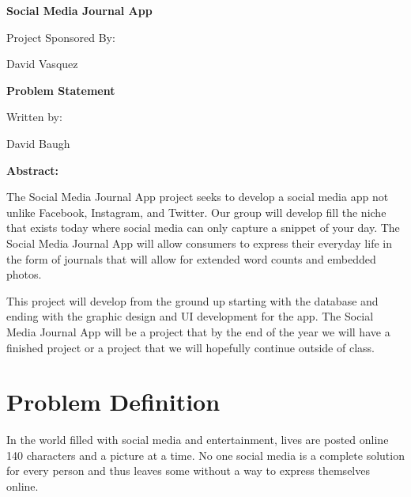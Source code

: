 \documentclass[letterpaper,10pt,titlepage]{article}
\begin{document}
\begin{titlepage}
\begin{center}
\vspace*{3cm}
\huge{\textbf{Social Media Journal App}}\par
\vspace{1cm}
\large{Project Sponsored By:}\par
\vspace{3mm}
\normalsize{David Vasquez}\par
\vspace{1cm}
\huge{\textbf{Problem Statement}}\par
\vspace{1cm}
\large{Written by:}\par
\vspace{3mm}
\normalsize{David Baugh}\par
\vspace{25mm}
\large{\textbf{Abstract:}}\par 
\vspace{4mm}
\normalsize{The Social Media Journal App project seeks to develop a social media 
app not unlike Facebook, Instagram, and Twitter. Our group will develop fill the 
niche that exists today where social media can only capture a snippet of your day. 
The Social Media Journal App will allow consumers to express their everyday life 
in the form of journals that will allow for extended word counts and embedded photos.

This project will develop from the ground up starting with the database and ending
 with the graphic design and UI development for the app. The Social Media Journal App
  will be a project that by the end of the year we will have a finished project or a 
  project that we will hopefully continue outside of class.}
\end{center}
\end{titlepage}

\setlength\parindent{4mm}
\section*{Problem Definition}\par
\hspace{4ex}In the world filled with social media and entertainment, lives are 
posted online 140 characters and a picture at a time. No one social media is 
a complete solution for every person and thus leaves some without a way to 
express themselves online.
\end{document}
